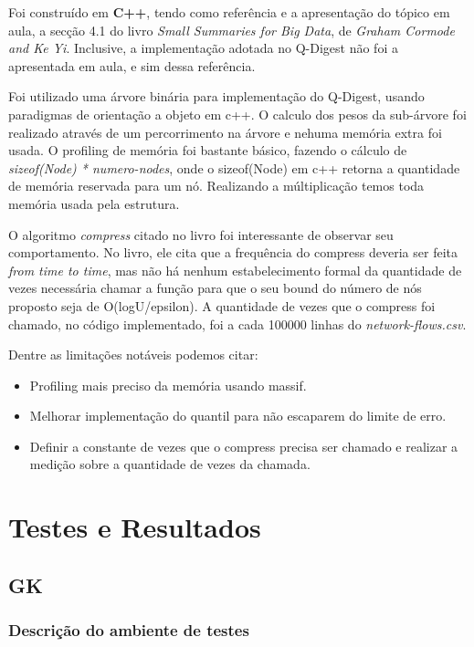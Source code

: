 \documentclass[11pt]{article}
\begin{document}
    Foi construído em \textbf{C++}, tendo como referência e a apresentação do tópico em aula, a secção 4.1 do livro \emph{Small Summaries for Big Data}, de \emph{Graham Cormode and Ke Yi}. Inclusive, a implementação adotada no Q-Digest não foi a apresentada em aula, e sim dessa referência.

    Foi utilizado uma árvore binária para implementação do Q-Digest, usando paradigmas de orientação a objeto em c++. O calculo dos pesos da sub-árvore foi realizado através de um percorrimento na árvore e nehuma memória extra foi usada. O profiling de memória foi bastante básico, fazendo o cálculo de \textit{sizeof(Node) * numero-nodes}, onde o sizeof(Node) em c++ retorna a quantidade de memória reservada para um nó. Realizando a múltiplicação temos toda memória usada pela estrutura.

    O algoritmo \textit{compress} citado no livro foi interessante de observar seu comportamento. No livro, ele cita que a frequência do compress deveria ser feita \textit{from time to time}, mas não há nenhum estabelecimento formal da quantidade de vezes necessária chamar a função para que o seu bound do número de nós proposto seja de O(logU/epsilon). A quantidade de vezes que o compress foi chamado, no código implementado, foi a cada 100000 linhas do \textit{network-flows.csv}.

    

Dentre as limitações notáveis podemos citar:
\begin{itemize}
  \item Profiling mais preciso da memória usando massif.
  \item Melhorar implementação do quantil para não escaparem do limite de erro.
  \item Definir a constante de vezes que o compress precisa ser chamado e realizar a medição sobre a quantidade de vezes da chamada.
\end{itemize}

\section{Testes e Resultados}

\subsection{GK}

\subsubsection{Descrição do ambiente de testes}
\end{document}
